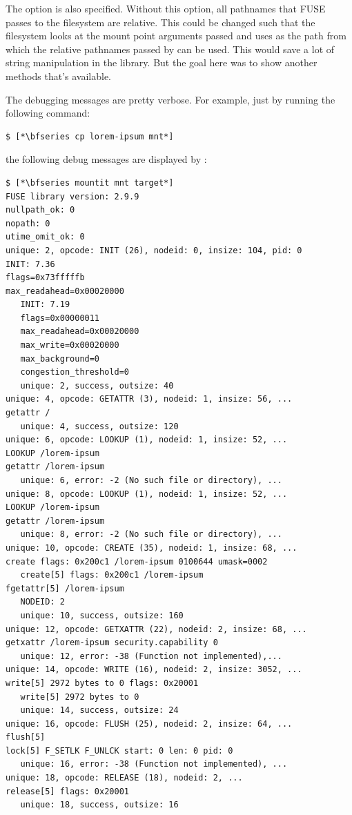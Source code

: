 \noindent
The  option is also specified. Without this option, all pathnames that FUSE passes to the filesystem are relative. This could be changed such that the filesystem looks at the mount point arguments passed and uses  as the path from which the relative pathnames passed by  can be used. This would save a lot of string manipulation in the library. But the goal here was to show another methods that's available.

The debugging messages are pretty verbose. For example, just by running the following command:

\begin{lstlisting}
$ [*\bfseries cp lorem-ipsum mnt*]
\end{lstlisting}

\noindent
the following debug messages are displayed by :

\begin{lstlisting}
$ [*\bfseries mountit mnt target*]
FUSE library version: 2.9.9
nullpath_ok: 0
nopath: 0
utime_omit_ok: 0
unique: 2, opcode: INIT (26), nodeid: 0, insize: 104, pid: 0
INIT: 7.36
flags=0x73fffffb
max_readahead=0x00020000
   INIT: 7.19
   flags=0x00000011
   max_readahead=0x00020000
   max_write=0x00020000
   max_background=0
   congestion_threshold=0
   unique: 2, success, outsize: 40
unique: 4, opcode: GETATTR (3), nodeid: 1, insize: 56, ...
getattr /
   unique: 4, success, outsize: 120
unique: 6, opcode: LOOKUP (1), nodeid: 1, insize: 52, ...
LOOKUP /lorem-ipsum
getattr /lorem-ipsum
   unique: 6, error: -2 (No such file or directory), ...
unique: 8, opcode: LOOKUP (1), nodeid: 1, insize: 52, ...
LOOKUP /lorem-ipsum
getattr /lorem-ipsum
   unique: 8, error: -2 (No such file or directory), ...
unique: 10, opcode: CREATE (35), nodeid: 1, insize: 68, ...
create flags: 0x200c1 /lorem-ipsum 0100644 umask=0002
   create[5] flags: 0x200c1 /lorem-ipsum
fgetattr[5] /lorem-ipsum
   NODEID: 2
   unique: 10, success, outsize: 160
unique: 12, opcode: GETXATTR (22), nodeid: 2, insize: 68, ...
getxattr /lorem-ipsum security.capability 0
   unique: 12, error: -38 (Function not implemented),...
unique: 14, opcode: WRITE (16), nodeid: 2, insize: 3052, ...
write[5] 2972 bytes to 0 flags: 0x20001
   write[5] 2972 bytes to 0
   unique: 14, success, outsize: 24
unique: 16, opcode: FLUSH (25), nodeid: 2, insize: 64, ...
flush[5]
lock[5] F_SETLK F_UNLCK start: 0 len: 0 pid: 0
   unique: 16, error: -38 (Function not implemented), ...
unique: 18, opcode: RELEASE (18), nodeid: 2, ...
release[5] flags: 0x20001
   unique: 18, success, outsize: 16
\end{lstlisting}

